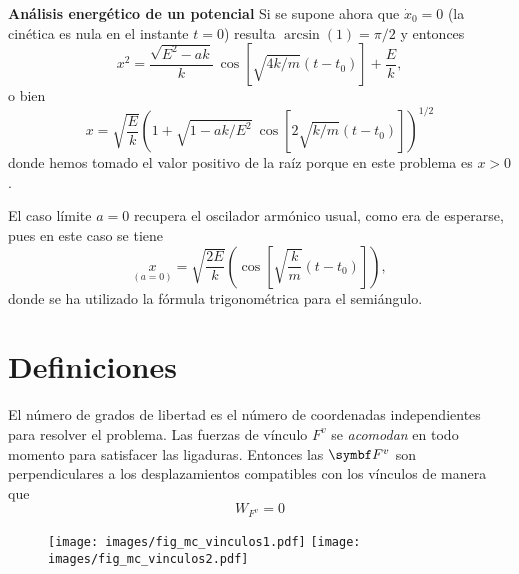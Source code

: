 \documentclass[10pt,oneside]{CBFT_book}
\begin{document}
\begin{ejemplo}{\bfseries Análisis energético de un potencial }
Si se supone ahora que $ \dot{x}_0 = 0 $ (la cinética es nula en el instante $t=0$) resulta $ \arcsin(1) = \pi/2 $ 
y entonces 
\[
	x^2 = \frac{\sqrt{E^2 - ak}}{k} \: \cos \left[ \sqrt{4k/m}(t-t_0) \right] + \frac{E}{k},
\]
o bien 
\[
	x = \sqrt{ \frac{E}{k} } \left( 1 + \sqrt{1 - ak/E^2}  \: \cos \left[ 2\sqrt{k/m}(t-t_0) \right] \right)^{1/2}
\]
donde hemos tomado el valor positivo de la raíz porque en este problema es $ x > 0 $ .

El caso límite $ a = 0 $ recupera el oscilador armónico usual, como era de esperarse, pues en este caso se tiene
\[
	\underset{(a = 0)}{x} = \sqrt{ \frac{2E}{k} } \left( \cos \left[ \sqrt{\frac{k}{m}}(t-t_0) \right] \right),
\]
donde se ha utilizado la fórmula trigonométrica para el semiángulo.



\end{ejemplo}




\section{Definiciones}

El número de grados de libertad es el número de coordenadas independientes para resolver el problema.
Las fuerzas de vínculo $F^v$ se {\it acomodan} en todo momento para satisfacer las ligaduras.
Entonces las $\vb{F}^v$ son perpendiculares a los desplazamientos compatibles con los vínculos de
manera que 
\[
	W_{F^v} = 0
\]
\begin{figure}[hbt]
	\begin{center}
	\texttt{[image: images/fig\_mc\_vinculos1.pdf]}	 
	\texttt{[image: images/fig\_mc\_vinculos2.pdf]}
	\end{center}
	\caption{}
\end{figure} 
\end{document}
